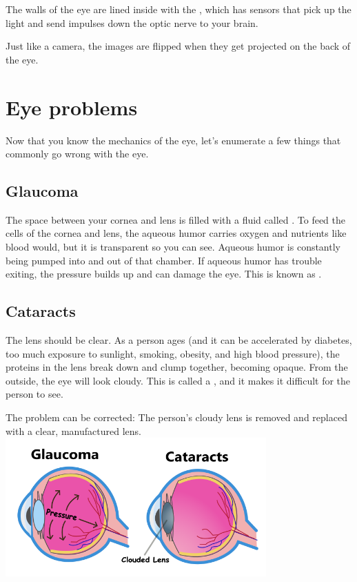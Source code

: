 The walls of the eye are lined inside with the , which has
 sensors that pick up the light and send impulses down the optic
nerve to your brain.

Just like a camera, the images are flipped when they get projected on
the back of the eye.

\section{Eye problems}

Now that you know the mechanics of the eye, let's enumerate a few
things that commonly go wrong with the eye.

\subsection{Glaucoma}

The space between your cornea and lens is filled with a fluid called
. To feed the cells of the cornea and lens,
the aqueous humor carries oxygen and nutrients like blood would, but
it is transparent so you can see. Aqueous humor is constantly being
pumped into and out of that chamber.  If aqueous humor has trouble
exiting, the pressure builds up and can damage the eye. This is known
as .

\subsection{Cataracts}

The lens should be clear. As a person ages (and it can be accelerated
by diabetes, too much exposure to sunlight, smoking, obesity, and high
blood pressure), the proteins in the lens break down and clump
together, becoming opaque. From the outside, the eye will look
cloudy. This is called a , and it makes it difficult
for the person to see.

The problem can be corrected: The person's cloudy lens is removed and
replaced with a clear, manufactured lens.
\includegraphics[width=0.75\textwidth]{Eye_Probs2.png}

